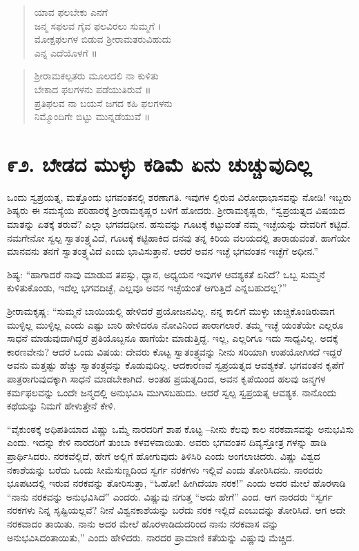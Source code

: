 \begin{verse}
ಯಾವ ಫಲಬೇಕು ಎನಗೆ\\ಜನ್ಮ ಸಫಲವ ಗೈವ ಫಲವಿರಲು ಸುಮ್ಮಗೆ ।\\ ಮೋಕ್ಷಫಲಗಳ ಬಿಡುವ ಶ್ರೀರಾಮತರುವಿಹುದು\\ಎನ್ನ ಎದೆಯೊಳಗೆ ॥
\end{verse}

\begin{verse}
ಶ್ರೀರಾಮಕಲ್ಪತರು ಮೂಲದಲಿ ನಾ ಕುಳಿತು\\ಬೇಕಾದ ಫಲಗಳನು ಪಡೆಯುತಿರುವೆ ॥\\ಪ್ರತಿಫಲವ ನಾ ಬಯಸೆ ಜಗದ ಕಹಿ ಫಲಗಳನು\\ನಿಮ್ಮೊಂದಿಗೇ ಬಿಟ್ಟು ಮುನ್ನಡೆಯುವೆ ॥
\end{verse}


\section{\num{೯೨. } ಬೇಡದ ಮುಳ್ಳು ಕಡಿಮೆ ಏನು ಚುಚ್ಚುವುದಿಲ್ಲ}

ಒಂದು ಸ್ವಪ್ರಯತ್ನ, ಮತ್ತೊಂದು ಭಗವಂತನಲ್ಲಿ ಶರಣಾಗತಿ. ಇವುಗಳ ಲ್ಲಿರುವ ವಿರೋಧಾಭಾಸವನ್ನು ನೋಡಿ! ಇಬ್ಬರು ಶಿಷ್ಯರು ಈ ಸಮಸ್ಯೆಯ ಪರಿಹಾರಕ್ಕೆ ಶ್ರೀರಾಮಕೃಷ್ಣರ ಬಳಿಗೆ ಹೋದರು. ಶ್ರೀರಾಮಕೃಷ್ಣರು, “ಸ್ವಪ್ರಯತ್ನದ ವಿಷಯದ ಮಾತನ್ನು ಏತಕ್ಕೆ ತರುವೆ? ಎಲ್ಲಾ ಭಗವದಧೀನ. ಹಸುವನ್ನು ಗೂಟಕ್ಕೆ ಕಟ್ಟುವಂತೆ ನಮ್ಮ ಇಚ್ಛೆಯನ್ನು ದೇವರಿಗೆ ಕಟ್ಟಿದೆ. ನಮಗೇನೋ ಸ್ವಲ್ಪ ಸ್ವಾತಂತ್ರ್ಯವಿದೆ, ಗೂಟಕ್ಕೆ ಕಟ್ಟಿಹಾಕಿದ ದನವು ತನ್ನ ಕಿರಿಯ ವಲಯದಲ್ಲಿ ತಾರಾಡುವಂತೆ. ಹಾಗೆಯೇ ಮಾನವನು ತನಗೆ ಸ್ವಾತಂತ್ರ್ಯವಿದೆ ಎಂದು ಭಾವಿಸುತ್ತಾನೆ. ಆದರೆ ಅವನ ಇಚ್ಛೆ ಭಗವಂತನ ಇಚ್ಛೆಗೆ ಅಧೀನ.”

ಶಿಷ್ಯ: “ಹಾಗಾದರೆ ನಾವು ಮಾಡುವ ತಪಸ್ಸು, ಧ್ಯಾನ, ಅಧ್ಯಯನ ಇವುಗಳ ಆವಶ್ಯಕತೆ ಏನಿದೆ? ಒಬ್ಬ ಸುಮ್ಮನೆ ಕುಳಿತುಕೊಂಡು, ಇದೆಲ್ಲ ಭಗವದಿಚ್ಛೆ, ಎಲ್ಲವೂ ಅವನ ಇಚ್ಛೆಯಂತೆ ಆಗುತ್ತಿದೆ ಎನ್ನಬಹುದಲ್ಲ?”

ಶ್ರೀರಾಮಕೃಷ್ಣ: “ಸುಮ್ಮನೆ ಬಾಯಿಯಲ್ಲಿ ಹೇಳಿದರೆ ಪ್ರಯೋಜನವಿಲ್ಲ. ನನ್ನ ಕಾಲಿಗೆ ಮುಳ್ಳು ಚುಚ್ಚಿಕೊಂಡಿರುವಾಗ ಮುಳ್ಳಿಲ್ಲ ಮುಳ್ಳಿಲ್ಲ ಎಂದು ಎಷ್ಟು ಬಾರಿ ಹೇಳಿದರೂ ನೋವಿನಿಂದ ಪಾರಾಗಲಾರೆ. ತಮ್ಮ ಇಚ್ಛೆ ಯಂತೆಯೇ ಎಲ್ಲರೂ ಸಾಧನೆ ಮಾಡುವುದಾಗಿದ್ದರೆ ಪ್ರತಿಯೊಬ್ಬನೂ ಹಾಗೆಯೇ ಮಾಡುತ್ತಿದ್ದ. ಇಲ್ಲ, ಎಲ್ಲರಿಗೂ ಇದು ಸಾಧ್ಯವಿಲ್ಲ. ಅದಕ್ಕೆ ಕಾರಣವೇನು? ಆದರೆ ಒಂದು ವಿಷಯ: ದೇವರು ಕೊಟ್ಟ ಸ್ವಾತಂತ್ರ್ಯವನ್ನು ನೀನು ಸರಿಯಾಗಿ ಉಪಯೋಗಿಸದೆ ಇದ್ದರೆ ಅವನು ಮತ್ತಷ್ಟು ಹೆಚ್ಚು ಸ್ವಾತಂತ್ರ್ಯವನ್ನು ಕೊಡುವುದಿಲ್ಲ. ಆದಕಾರಣವೆ ಸ್ವಪ್ರಯತ್ನದ ಆವಶ್ಯಕತೆ. ಭಗವಂತನ ಕೃಪೆಗೆ ಪಾತ್ರರಾಗುವುದಕ್ಕಾಗಿ ಸಾಧನೆ ಮಾಡಬೇಕಾಗಿದೆ. ಅಂತಹ ಪ್ರಯತ್ನದಿಂದ, ಅವನ ಕೃಪೆಯಿಂದ ಹಲವು ಜನ್ಮಗಳ ಕರ್ಮಫಲವನ್ನು ಒಂದೇ ಜನ್ಮದಲ್ಲಿ ಅನುಭವಿಸಿ ಮುಗಿಸಬಹುದು. ಆದರೆ ಸ್ವಲ್ಪ ಸ್ವಪ್ರಯತ್ನ ಆವಶ್ಯಕ. ನಾನೊಂದು ಕಥೆಯನ್ನು ನಿಮಗೆ ಹೇಳುತ್ತೇನೆ ಕೇಳಿ.

“ವೈಕುಂಠಕ್ಕೆ ಅಧಿಪತಿಯಾದ ವಿಷ್ಣು ಒಮ್ಮೆ ನಾರದರಿಗೆ ಶಾಪ ಕೊಟ್ಟ –ನೀನು ಕೆಲವು ಕಾಲ ನರಕವಾಸವನ್ನು ಅನುಭವಿಸು ಎಂದು. ಇದನ್ನು ಕೇಳಿ ನಾರದರಿಗೆ ತುಂಬಾ ಕಳವಳವಾಯಿತು. ಅವರು ಭಗವಂತನ ದಿವ್ಯಸ್ತೋತ್ರ ಗಳನ್ನು ಹಾಡಿ ಪ್ರಾರ್ಥಿಸಿದರು. ನರಕವೆಲ್ಲಿದೆ, ಹೇಗೆ ಅಲ್ಲಿಗೆ ಹೋಗುವುದು ತಿಳಿಸಿರಿ ಎಂದು ಅಂಗಲಾಚಿದರು. ವಿಷ್ಣು ವಿಶ್ವದ ನಕಾಶೆಯನ್ನು ಬರೆದು ಒಂದು ಸೀಮೆಸುಣ್ಣದಿಂದ ಸ್ವರ್ಗ ನರಕಗಳು ಇಲ್ಲಿವೆ ಎಂದು ತೋರಿಸಿದನು. ನಾರದರು ಭೂಪಟದಲ್ಲಿ ಇರುವ ನರಕವನ್ನು ತೋರಿಸುತ್ತಾ, “ಓಹೋ! ಹೀಗಿದೆಯಾ ನರಕ!” ಎಂದು ಅದರ ಮೇಲೆ ಹೊರಳಾಡಿ “ನಾನು ನರಕವನ್ನು ಅನುಭವಿಸಿದೆ” ಎಂದರು. ವಿಷ್ಣುವು ನಗುತ್ತ “ಅದು ಹೇಗೆ” ಎಂದ. ಆಗ ನಾರದರು “ಸ್ವರ್ಗ ನರಕಗಳು ನಿನ್ನ ಸೃಷ್ಟಿಯಲ್ಲವೆ? ನೀನೆ ವಿಶ್ವನಕಾಶೆಯನ್ನು ಬರೆದು ನರಕ ಇಲ್ಲಿದೆ ಎಂಬುದನ್ನು ತೋರಿಸಿದೆ. ಆಗ ಅದೇ ನರಕವಾದಂ ತಾಯಿತು. ನಾನು ಅದರ ಮೇಲೆ ಹೊರಳಾಡಿದುದರಿಂದ ನಾನು ನರಕವಾಸ ವನ್ನು ಅನುಭವಿಸಿದಂತಾಯಿತು,” ಎಂದು ಹೇಳಿದರು. ನಾರದರ ಪ್ರಾಮಾಣಿ ಕತೆಯನ್ನು ವಿಷ್ಣುವು ಮೆಚ್ಚಿದ.


